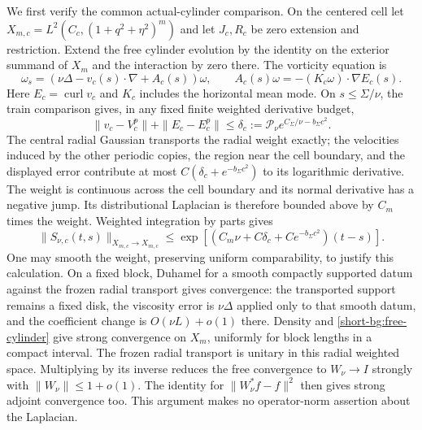 We first verify the common actual-cylinder comparison. On the centered
cell let $X_{m,c}=L^2(C_c,(1+q^2+\eta^2)^m)$ and let $J_c,R_c$ be
zero extension and restriction. Extend the free cylinder evolution by
the identity on the exterior summand of $X_m$ and the interaction by
zero there. The vorticity equation is
\begin{equation}
 \omega_s=(\nu\Delta-v_c(s)\cdot\nabla+A_c(s))\omega,
 \qquad A_c(s)\omega=-(K_c\omega)\cdot\nabla E_c(s).
 \label{short-bg:actual-cylinder}
\end{equation}
Here $E_c=\operatorname{curl}v_c$ and $K_c$ includes the horizontal
mean mode. On $s\le\Sigma/\nu$, the train comparison gives, in any
fixed finite weighted derivative budget,
\[
 \|v_c-V_c^p\|+\|E_c-E_c^p\|
 \le\delta_c:=\mathcal P_\nu
                  e^{C_\Sigma/\nu-b_\Sigma c^2}.
\]
The central radial Gaussian transports the radial weight exactly;
the velocities induced by the other periodic copies, the region near the
cell boundary, and the displayed error contribute at most
$C(\delta_c+e^{-b_\Sigma c^2})$ to its logarithmic derivative.
The weight is continuous across the cell boundary and its normal derivative has
a negative jump. Its distributional Laplacian is therefore bounded
above by $C_m$ times the weight. Weighted integration by parts gives
\begin{equation}
 \|S_{\nu,c}(t,s)\|_{X_{m,c}\to X_{m,c}}
 \le\exp[(C_m\nu+C\delta_c+Ce^{-b_\Sigma c^2})(t-s)].
 \label{short-bg:free-cylinder}
\end{equation}
One may smooth the weight, preserving uniform comparability, to justify
this calculation. On a fixed block, Duhamel for a smooth compactly
supported datum against the frozen radial transport gives convergence:
the transported support remains a fixed disk, the viscosity error is
$\nu\Delta$ applied only to that smooth datum, and the coefficient
change is $O(\nu L)+o(1)$ there. Density and
\eqref{short-bg:free-cylinder} give strong convergence on $X_m$,
uniformly for block lengths in a compact interval. The frozen radial
transport is unitary in this radial weighted space. Multiplying by its
inverse reduces the free convergence to $W_\nu\to I$ strongly with
$\|W_\nu\|\le1+o(1)$. The identity for
$\|W_\nu^*f-f\|^2$ then gives strong adjoint convergence too. This
argument makes no operator-norm assertion about the Laplacian.

